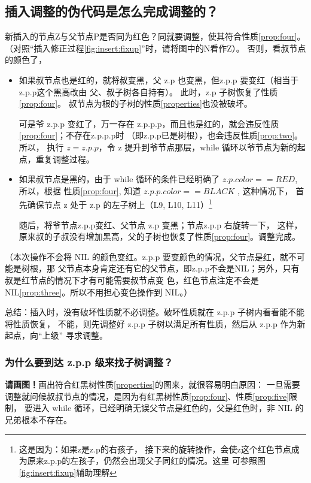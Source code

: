 \documentclass[a4paper, 11pt]{article}
\begin{document}
\subsection{插入调整的伪代码是怎么完成调整的？}
新插入的节点Z与父节点P是否同为红色？同就要调整，使其符合性质\ref{prop:four}。
（对照``插入修正过程\ref{fig:insert:fixup}''时，请将图中的N看作Z）。\newline
否则，看叔节点的颜色了，
\begin{itemize}
	
\item 如果叔节点也是红的，就将叔变黑，父 z.p 也变黑，但z.p.p 要变红（相当于z.p.p这个黑高改由
父、叔子树各自持有）。
此时，z.p 子树恢复了性质\ref{prop:four}。
叔节点为根的子树的性质\ref{properties}也没被破坏。 \par

可是爷 z.p.p 变红了，万一存在 z.p.p.p，而且也是红的，就会违反性质\ref{prop:four}；不存在z.p.p.p时
（即z.p.p已是树根），也会违反性质\ref{prop:two}。所以，
执行 $z = z.p.p$，令 z 提升到爷节点那层，while 循环以爷节点为新的起点，重复调整过程。

\item 如果叔节点是黑的，由于 while 循环的条件已经明确了 $z.p.color == RED$, 所以，根据
性质\ref{prop:four}, 知道 $z.p.p.color == BLACK$ , 这种情况下，
首先确保节点 z 处于 z.p 的左子树上（L9, L10, L11）\footnote{这是因为：如果z是z.p的右孩子，
	接下来的旋转操作，会使z这个红色节点成为原来z.p.p的左孩子，仍然会出现父子同红的情况。这里
	可参照图\ref{fig:insert:fixup}辅助理解} \par
随后，将爷节点z.p.p变红、父节点 z.p 变黑；节点z.p.p 右旋转一下，
这样，原来叔的子叔没有增加黑高，父的子树也恢复了性质\ref{prop:four}。调整完成。

\end{itemize}

（本次操作不会将 NIL 的颜色变红。z.p.p 要变颜色的情况，父节点是红，就不可能是树根，那
父节点本身肯定还有它的父节点，即z.p.p不会是NIL；另外，只有叔是红节点的情况下才有可能需要叔节点变
色，红色节点注定不会是 NIL\ref{prop:three}。所以不用担心变色操作到 NIL。）

总结：插入时，没有破坏性质就不必调整。破坏性质就在 z.p.p 子树内看看能不能将性质恢复，
不能，则先调整好 z.p.p 子树以满足所有性质，然后从 z.p.p 作为新起点，向``上级''
寻求调整。

\subsubsection{为什么要到达 z.p.p 级来找子树调整？}\label{why:zpp}
\textbf{请画图！}画出符合红黑树性质\ref{properties}的图来，就很容易明白原因：
一旦需要调整就问候叔叔节点的情况，是因为有红黑树性质\ref{prop:four}、性质\ref{prop:five}限制，
要进入 while 循环，已经明确无误父节点是红色的，父是红色时，非 NIL 的兄弟根本不存在。
\end{document}
